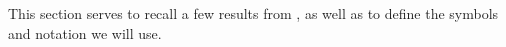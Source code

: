 \documentclass[../main-v2-manifolds.tex]{subfiles}
\begin{document}
\newpage

This section serves to recall a few results from \cite{Brezis2010Functional,Folland2013Real,Roman2007Advanced,Lee2013Introduction,Lee2019Introduction}, as well as to define the symbols and notation we will use.
\end{document}

